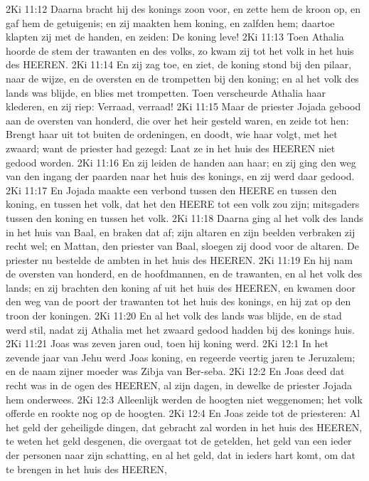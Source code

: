 2Ki 11:12  Daarna bracht hij des konings zoon voor, en zette hem de kroon op, en gaf hem de getuigenis; en zij maakten hem koning, en zalfden hem; daartoe klapten zij met de handen, en zeiden: De koning leve!
2Ki 11:13  Toen Athalia hoorde de stem der trawanten en des volks, zo kwam zij tot het volk in het huis des HEEREN.
2Ki 11:14  En zij zag toe, en ziet, de koning stond bij den pilaar, naar de wijze, en de oversten en de trompetten bij den koning; en al het volk des lands was blijde, en blies met trompetten. Toen verscheurde Athalia haar klederen, en zij riep: Verraad, verraad!
2Ki 11:15  Maar de priester Jojada gebood aan de oversten van honderd, die over het heir gesteld waren, en zeide tot hen: Brengt haar uit tot buiten de ordeningen, en doodt, wie haar volgt, met het zwaard; want de priester had gezegd: Laat ze in het huis des HEEREN niet gedood worden.
2Ki 11:16  En zij leiden de handen aan haar; en zij ging den weg van den ingang der paarden naar het huis des konings, en zij werd daar gedood.
2Ki 11:17  En Jojada maakte een verbond tussen den HEERE en tussen den koning, en tussen het volk, dat het den HEERE tot een volk zou zijn; mitsgaders tussen den koning en tussen het volk.
2Ki 11:18  Daarna ging al het volk des lands in het huis van Baal, en braken dat af; zijn altaren en zijn beelden verbraken zij recht wel; en Mattan, den priester van Baal, sloegen zij dood voor de altaren. De priester nu bestelde de ambten in het huis des HEEREN.
2Ki 11:19  En hij nam de oversten van honderd, en de hoofdmannen, en de trawanten, en al het volk des lands; en zij brachten den koning af uit het huis des HEEREN, en kwamen door den weg van de poort der trawanten tot het huis des konings, en hij zat op den troon der koningen.
2Ki 11:20  En al het volk des lands was blijde, en de stad werd stil, nadat zij Athalia met het zwaard gedood hadden bij des konings huis.
2Ki 11:21  Joas was zeven jaren oud, toen hij koning werd.
2Ki 12:1  In het zevende jaar van Jehu werd Joas koning, en regeerde veertig jaren te Jeruzalem; en de naam zijner moeder was Zibja van Ber-seba.
2Ki 12:2  En Joas deed dat recht was in de ogen des HEEREN, al zijn dagen, in dewelke de priester Jojada hem onderwees.
2Ki 12:3  Alleenlijk werden de hoogten niet weggenomen; het volk offerde en rookte nog op de hoogten.
2Ki 12:4  En Joas zeide tot de priesteren: Al het geld der geheiligde dingen, dat gebracht zal worden in het huis des HEEREN, te weten het geld desgenen, die overgaat tot de getelden, het geld van een ieder der personen naar zijn schatting, en al het geld, dat in ieders hart komt, om dat te brengen in het huis des HEEREN,
